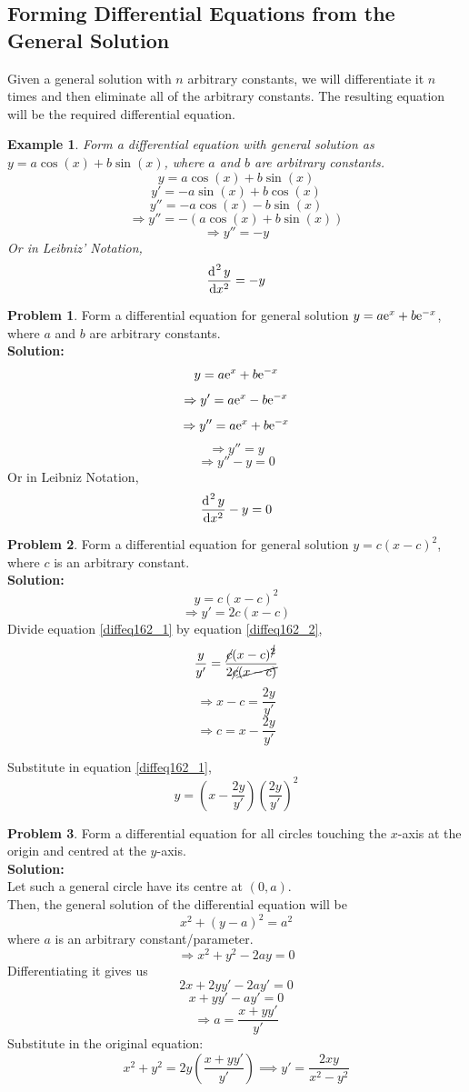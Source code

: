 \documentclass[14]{article}
\newtheorem*{ex}{Example}
\theoremstyle{definition}
\newtheorem{prob}{Problem}
\theoremstyle{case}
\begin{document}
\subsection{Forming Differential Equations from the General Solution}
Given a general solution with $n$ arbitrary constants, we will differentiate it $n$ times and then eliminate all of the arbitrary constants. The resulting equation will be the required differential equation.
\begin{ex}
Form a differential equation with general solution as $y = a\cos(x) + b \sin(x)$, where $a$ and $b$ are arbitrary constants.
\[y = a \cos(x) + b \sin(x)\]
\[y' = -a \sin(x) + b \cos(x)\]
\[y'' = -a \cos(x) - b \sin(x)\]
\[\Rightarrow y'' = - \left(a \cos(x) + b\sin(x) \right)\]
\[\Rightarrow y'' = - y\]
Or in Leibniz' Notation,
\[\dfrac{\dif ^{\;2} y}{\dif x^2} = -y\]
\end{ex}
\pagebreak
\begin{prob}
Form a differential equation for general solution $y = a {\rm e}^x + b {\rm e}^{-x}$, where $a$ and $b$ are arbitrary constants.\\
\textbf{Solution:}
\[y = a{\rm e}^x + b{\rm e}^{-x}\]
\[\Rightarrow y' = a{\rm e}^{x} - b {\rm e}^{-x}\]
\[\Rightarrow y'' = a{\rm e}^x + b{\rm e}^{-x}\]
\[\Rightarrow y'' = y\]
\[\Rightarrow y'' - y = 0\]
Or in Leibniz Notation,
\[\dfrac{\dif^{\; 2} y}{\dif x^2} - y = 0\]
\end{prob}
\begin{prob}
Form a differential equation for general solution $y = c(x-c)^2$, where $c$ is an arbitrary constant.\\
\textbf{Solution:}
\begin{equation}\label{diffeq162_1}
y = c(x-c)^2
\end{equation}
\begin{equation}\label{diffeq162_2}
\Rightarrow y' = 2c(x-c)
\end{equation}
Divide equation \eqref{diffeq162_1} by equation \eqref{diffeq162_2},
\[\dfrac{y}{y'} = \dfrac{\cancel{c}(x-c)^{\cancel{2}}}{2\cancel{c}\cancel{(x-c)}}\]
\[\Rightarrow x-c = \dfrac{2y}{y'}\]
\[\Rightarrow c = x - \dfrac{2y}{y'}\]
\end{prob}
Substitute in equation \eqref{diffeq162_1},
\[y = \left(x - \dfrac{2y}{y'}\right) \left(\dfrac{2y}{y'}\right)^2\]
\begin{prob}
Form a differential equation for all circles touching the $x$-axis at the origin and centred at the $y$-axis.\\
\textbf{Solution:}\\
Let such a general circle have its centre at $(0, a)$.\\
Then, the general solution of the differential equation will be
\[x^2 + (y-a)^2 = a^2\]
where $a$ is an arbitrary constant/parameter.\\
\[\Rightarrow x^2 + y^2 - 2ay = 0\]
Differentiating it gives us
\[2x + 2y y' - 2ay' = 0\]
\[x + yy' - ay' = 0\]
\[\Rightarrow a = \dfrac{x + yy'}{y'}\]
Substitute in the original equation:
\[x^2 + y^2 =2y\left(\dfrac{x+yy'}{y'}\right) \implies y'=\dfrac{2xy}{x^2 - y^2}\]
\end{prob}
\end{document}
